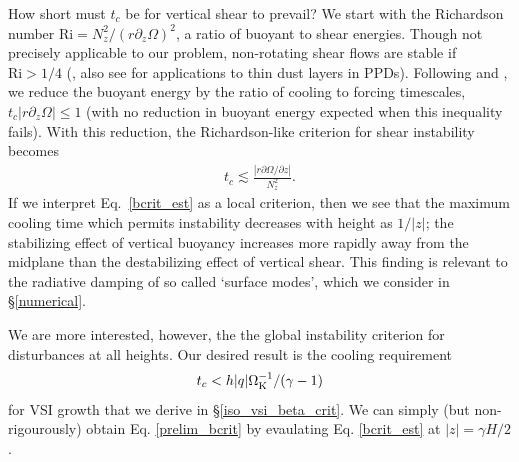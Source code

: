 \documentclass[iop, numberedappendix]{emulateapj}
\newcommand{\p}{\partial}
\def \OmK {\Omega_{\rm K}}
\begin{document}
How short must $t_c$ be for vertical shear to prevail?  We start with 
 the Richardson number $\mathrm{Ri} = N_z^2/(r\p_z\Omega)^2$, a 
ratio of buoyant to shear energies.  Though not precisely applicable to our problem,
non-rotating shear flows are stable if $\mathrm{Ri} > 1/4$ (\citealp{chandrasekhar61}, 
also see \citealp{ys02, lee10} for applications to thin dust layers in PPDs).
Following \cite{urpin03} and \cite{townsend58},  we reduce the buoyant energy by the 
ratio of cooling to forcing timescales, $t_c |r \p_z\Omega| \leq 1$ (with no reduction in buoyant energy 
expected when this inequality fails).  With this reduction, the Richardson-like criterion for 
shear instability becomes  \citep{urpin03}
\begin{align}\label{bcrit_est}
  t_c \lesssim \frac{\left|r\p\Omega/\p z\right|} {N_z^2}.
\end{align}
If we interpret Eq.\ \ref{bcrit_est} as a local criterion, then we see that 
the maximum cooling time which permits instability decreases with height as $1/|z|$;  
the stabilizing effect of vertical buoyancy increases more rapidly away from
the midplane than the destabilizing effect of vertical shear.  
This finding is relevant to the radiative damping of so called `surface 
modes', which we consider in \S\ref{numerical}.

We are more interested, however, the the global instability criterion for disturbances at all heights.
Our desired result 
is the cooling requirement 
\begin{align}\label{prelim_bcrit}
  t_c <  h |q| \OmK^{-1}/ (\gamma - 1)
\end{align}   
for VSI growth that we derive in \S\ref{iso_vsi_beta_crit}.  We can simply 
(but non-rigourously) obtain Eq. \ref{prelim_bcrit}
  by evaulating  Eq. \ref{bcrit_est} at $|z|=\gamma H/2$. %

\end{document}
